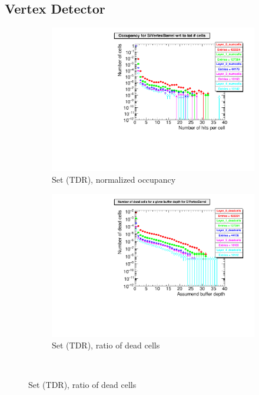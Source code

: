 \subsection{Vertex Detector}
  \begin{figure}
 \centering
   \begin{subfigure}[b]{0.49\textwidth}
   \centering
    \includegraphics[width=\textwidth]{Figures/Pairs/Appendix/occupancy_numcells_SiVertexBarrel_ILC250_TDR.pdf}
   \caption{Set (TDR), normalized occupancy}
   \end{subfigure}
   \hfill
    \begin{subfigure}[b]{0.49\textwidth}
   \centering
    \includegraphics[width=\textwidth]{Figures/Pairs/Appendix/occupancy_deadcells_SiVertexBarrel_ILC250_TDR.pdf}
   \caption{Set (TDR), ratio of dead cells}
   \end{subfigure}\\

\end{figure}
